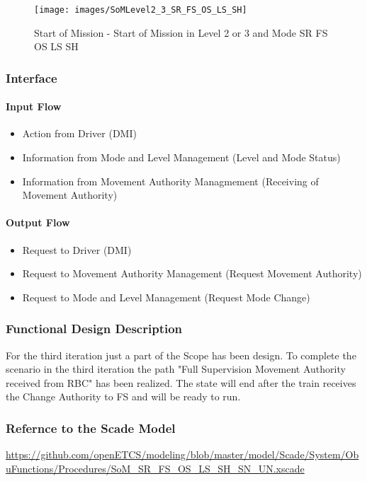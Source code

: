 \begin{figure}
\centering
\texttt{[image: images/SoMLevel2\_3\_SR\_FS\_OS\_LS\_SH]}
\caption{Start of Mission - Start of Mission in Level 2 or 3 and Mode SR FS OS LS SH}
\label{Start of Mission - Start of Mission in Level 2 or 3 and Mode SR FS OS LS SH}
\end{figure}


\subsubsection{Interface}
\paragraph{Input Flow}
\begin{itemize}
\item Action from Driver (DMI)
\item Information from Mode and Level Management (Level and Mode Status)
\item Information from Movement Authority Managmement (Receiving of Movement Authority)
\end{itemize}

\paragraph{Output Flow}
\begin{itemize}
\item Request to Driver (DMI)
\item Request to Movement Authority Management (Request Movement Authority)
\item Request to Mode and Level Management (Request Mode Change)
\end{itemize}


\subsubsection{Functional Design Description}
For the third iteration just a part of the Scope has been design. To complete the scenario in the third iteration the path "Full Supervision Movement Authority received from RBC" has been realized. The state will end after the train receives the Change Authority to FS and will be ready to run.

\subsubsection{Refernce to the Scade Model}
\url{https://github.com/openETCS/modeling/blob/master/model/Scade/System/ObuFunctions/Procedures/SoM_SR_FS_OS_LS_SH_SN_UN.xscade}

